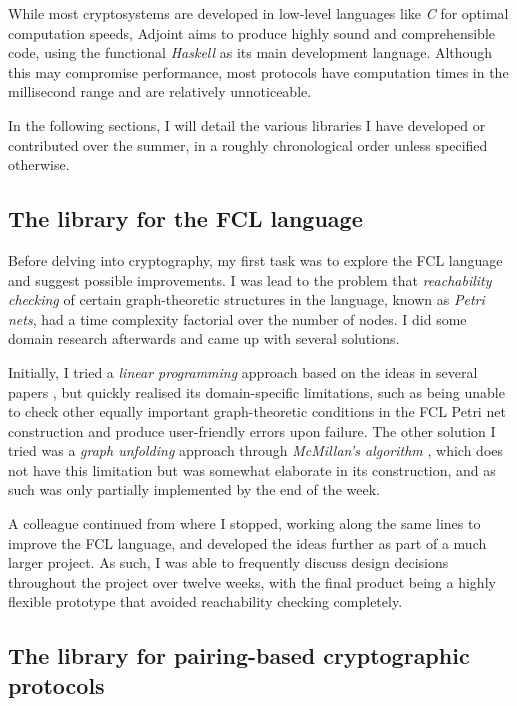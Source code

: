 \documentclass[11pt]{article}
\begin{document}
While most cryptosystems are developed in low-level languages like \emph{C} for optimal computation speeds, Adjoint aims to produce highly sound and comprehensible code, using the functional \emph{Haskell} as its main development language. Although this may compromise performance, most protocols have computation times in the millisecond range and are relatively unnoticeable.

In the following sections, I will detail the various libraries I have developed or contributed over the summer, in a roughly chronological order unless specified otherwise.

\subsection{The library for the FCL language}

Before delving into cryptography, my first task was to explore the FCL language and suggest possible improvements. I was lead to the problem that \emph{reachability checking} of certain graph-theoretic structures in the language, known as \emph{Petri nets}, had a time complexity factorial over the number of nodes. I did some domain research afterwards and came up with several solutions.

Initially, I tried a \emph{linear programming} approach based on the ideas in several papers \cite{kostin}, but quickly realised its domain-specific limitations, such as being unable to check other equally important graph-theoretic conditions in the FCL Petri net construction and produce user-friendly errors upon failure. The other solution I tried was a \emph{graph unfolding} approach through \emph{McMillan's algorithm} \cite{mcmillan}, which does not have this limitation but was somewhat elaborate in its construction, and as such was only partially implemented by the end of the week.

A colleague continued from where I stopped, working along the same lines to improve the FCL language, and developed the ideas further as part of a much larger project. As such, I was able to frequently discuss design decisions throughout the project over twelve weeks, with the final product being a highly flexible prototype that avoided reachability checking completely.

\subsection{The library for pairing-based cryptographic protocols}
\end{document}
